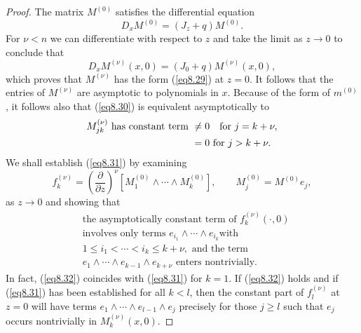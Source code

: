 \documentclass{surv-l}
\theoremstyle{plain}
\theoremstyle{definition}
\numberwithin{equation}{chapter}
\begin{document}
\begin{proof}
The matrix $M^{(0)}$ satisfies the differential equation
\begin{equation*}
D_{x}M^{(0)}=(J_{z}+q)M^{(0)}.
\end{equation*}
For $\nu <n$ we can differentiate with respect to $z$ and take the limit as $z\rightarrow 0$ to conclude that
\begin{equation*}
D_{x}M^{(\nu)}(x, 0)=(J_{0}+q)M^{(\nu)}(x, 0),
\end{equation*}
which proves that $M^{(\nu)}$ has the form (\ref{eq8.29}) at $z=0$. It follows that the entries of $M^{(\nu)}$ are asymptotic to polynomials in $x$. Because of the form of $m^{(0)}$, it follows also that (\ref{eq8.30}) is equivalent asymptotically to
\begin{align}\label{eq8.31}
M_{jk}^{(\nu)}\text{ has constant term }&\neq 0\quad \text{for } j = k+\nu,\\
&=0\ \mathrm{for}\ j > k + \nu.\notag
\end{align}
We shall establish (\ref{eq8.31}) by examining
\begin{equation*}
f_{k}^{(\nu)}=\left(\frac{\partial}{\partial z}\right)^{\nu}[M_{1}^{(0)}\wedge\cdots \wedge M_{k}^{(0)}],\qquad M_{j}^{(0)}=M^{(0)}e_{j},
\end{equation*}
as $z\rightarrow 0$ and showing that
\begin{align}\label{eq8.32}
\nonumber&\text{the asymptotically constant term of } f_{k}^{(\nu)}(\cdot, 0)\\
\nonumber&\text{involves only terms }  e_{i_{1}}\wedge\cdots\wedge e_{i_{k}} \mathrm{with}\\
\nonumber&1\leq i_{1}< \cdots <i_{k}\leq k+\nu, \text{ and the term}\\
& e_{1}\wedge\cdots \wedge e_{k-1}\wedge e_{k+\nu} \text{ enters nontrivially}.
\end{align}
In fact, (\ref{eq8.32}) coincides with (\ref{eq8.31}) for $k=1$. If (\ref{eq8.32}) holds and if (\ref{eq8.31}) has been established for all $k<l$, then the constant part of $f_{l}^{(\nu)}$ at $z=0$ will have terms $e_{1}\wedge\cdots \wedge e_{l-1}\wedge e_{j}$ precisely for those $j\geq l$ such that $e_{j}$ occurs nontrivially in $M_{k}^{(\nu)}(x,0)$.


\end{proof}
\end{document}
